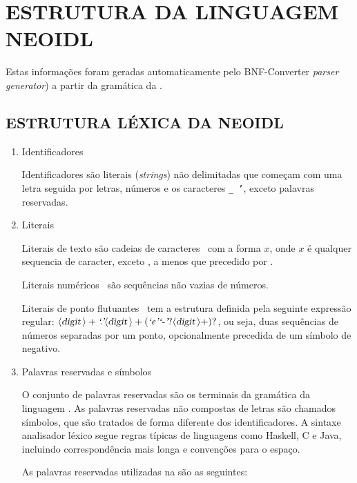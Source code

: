 \chapter{ESTRUTURA DA LINGUAGEM NEOIDL}
\label{apend-estruturaLexicaNeoIDL}

Estas informações foram geradas automaticamente pelo BNF-Converter \cite{forsberg-bnfc:2004}
\textit{parser generator}) a partir da gramática da \neoidl{}.

\section{ESTRUTURA LÉXICA DA NEOIDL}

\begin{enumerate}
  \item Identificadores
  
  Identificadores  são literais (\textit{strings}) não
  delimitadas que começam com uma letra seguida por letras, números e os caracteres {\tt \_ '},
  exceto palavras reservadas.
  
  \item Literais
  
  Literais de texto são cadeias de caracteres  \ com a forma
  $x$, onde $x$ é qualquer sequencia de caracter,
  exceto , a menos que precedido por .
  
  Literais numéricos \ são sequências não vazias de números.
  
  Literais de ponto flutuantes \ tem a estrutura
  definida pela seguinte expressão regular: $\mbox{$\langle \mbox{{\sl digit }} \! \rangle$}+ \mbox{{\it
  `.'}} \mbox{$\langle \mbox{{\sl digit }} \! \rangle$}+ (\mbox{{\it `e'}} \mbox{{\it `-'}}?
  \mbox{$\langle \mbox{{\sl digit }} \! \rangle$}+)?$, ou seja, duas sequências de números separadas por um
  ponto, opcionalmente precedida de um símbolo de negativo.

  \item Palavras reservadas e símbolos

  O conjunto de palavras reservadas são os terminais da gramática da linguagem
  \neoidl{}. As palavras reservadas não compostas de letras são chamados
  símbolos, que são tratados de forma diferente dos identificadores. A
  sintaxe analisador léxico segue regras típicas de linguagens como Haskell, C e
  Java, incluindo correspondência mais longa e convenções para o espaço.
  
  As palavras reservadas utilizadas na \neoidl{} são as seguintes: \\


\end{enumerate}
